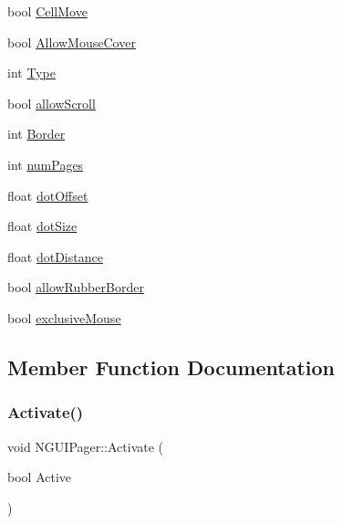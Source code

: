 \begin{DoxyCompactItemize}
\item 
bool \hyperlink{class_n_g_u_i_pager_a204fd72e6440527f52b889893332e0e3}{Cell\+Move}
\item 
bool \hyperlink{class_n_g_u_i_pager_addb975e75fa28cbe7f457aa4976fbf84}{Allow\+Mouse\+Cover}
\item 
int \hyperlink{class_n_g_u_i_pager_a1bc92770bdcb0fb48be8509dbf119a8c}{Type}
\item 
bool \hyperlink{class_n_g_u_i_pager_a26be79629d5838d4060fa361bcfa3665}{allow\+Scroll}
\item 
int \hyperlink{class_n_g_u_i_pager_adf0e88d4b7afa00505f80bd2ce92b3fb}{Border}
\item 
int \hyperlink{class_n_g_u_i_pager_a28a2b8031dcce489c2de5361c479e42d}{num\+Pages}
\item 
float \hyperlink{class_n_g_u_i_pager_ae981887577b67779a8068323862e22f4}{dot\+Offset}
\item 
float \hyperlink{class_n_g_u_i_pager_ae186bfe43b9c15ca8735978c68b1d1dd}{dot\+Size}
\item 
float \hyperlink{class_n_g_u_i_pager_a1a6ebb29f861318c885d837370e99f5a}{dot\+Distance}
\item 
bool \hyperlink{class_n_g_u_i_pager_a14d4f7a260013eb8d90674b8b755bd92}{allow\+Rubber\+Border}
\item 
bool \hyperlink{class_n_g_u_i_pager_afeea7ef66758aba362a9a4db2cca2dfd}{exclusive\+Mouse}
\end{DoxyCompactItemize}


\subsection{Member Function Documentation}
\hypertarget{class_n_g_u_i_pager_a23f135091e22edda1a3d8188766b9f7e}{}\label{class_n_g_u_i_pager_a23f135091e22edda1a3d8188766b9f7e} 
\subsubsection{\texorpdfstring{Activate()}{Activate()}}
{\footnotesize\ttfamily void N\+G\+U\+I\+Pager\+::\+Activate (\begin{DoxyParamCaption}\item[{bool}]{Active }\end{DoxyParamCaption})}

\hypertarget{class_n_g_u_i_pager_a674d792971d56a9be0df41066191aab8}{}\label{class_n_g_u_i_pager_a674d792971d56a9be0df41066191aab8} 
